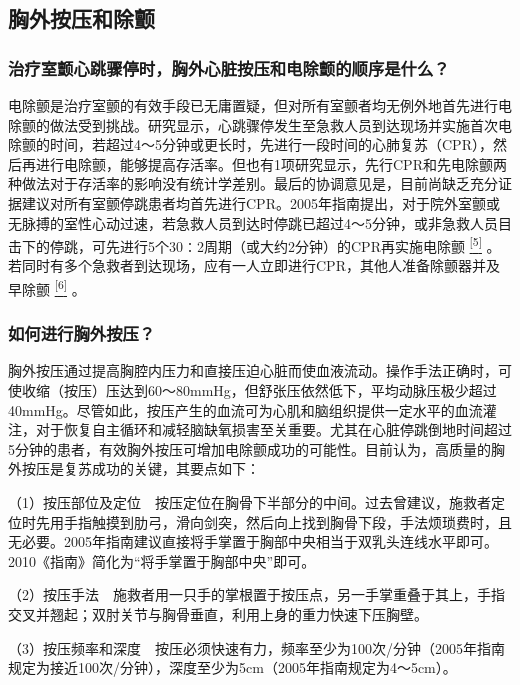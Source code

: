 \subsection{胸外按压和除颤}

\subsubsection{治疗室颤心跳骤停时，胸外心脏按压和电除颤的顺序是什么？}

电除颤是治疗室颤的有效手段已无庸置疑，但对所有室颤者均无例外地首先进行电除颤的做法受到挑战。研究显示，心跳骤停发生至急救人员到达现场并实施首次电除颤的时间，若超过4～5分钟或更长时，先进行一段时间的心肺复苏（CPR），然后再进行电除颤，能够提高存活率。但也有1项研究显示，先行CPR和先电除颤两种做法对于存活率的影响没有统计学差别。最后的协调意见是，目前尚缺乏充分证据建议对所有室颤停跳患者均首先进行CPR。2005年指南提出，对于院外室颤或无脉搏的室性心动过速，若急救人员到达时停跳已超过4～5分钟，或非急救人员目击下的停跳，可先进行5个30∶2周期（或大约2分钟）的CPR再实施电除颤
\protect\hyperlink{text00023.htmlux5cux23ch5-22}{\textsuperscript{{[}5{]}}}
。若同时有多个急救者到达现场，应有一人立即进行CPR，其他人准备除颤器并及早除颤
\protect\hyperlink{text00023.htmlux5cux23ch6-22}{\textsuperscript{{[}6{]}}}
。

\subsubsection{如何进行胸外按压？}

胸外按压通过提高胸腔内压力和直接压迫心脏而使血液流动。操作手法正确时，可使收缩（按压）压达到60～80mmHg，但舒张压依然低下，平均动脉压极少超过40mmHg。尽管如此，按压产生的血流可为心肌和脑组织提供一定水平的血流灌注，对于恢复自主循环和减轻脑缺氧损害至关重要。尤其在心脏停跳倒地时间超过5分钟的患者，有效胸外按压可增加电除颤成功的可能性。目前认为，高质量的胸外按压是复苏成功的关键，其要点如下：

（1）按压部位及定位　按压定位在胸骨下半部分的中间。过去曾建议，施救者定位时先用手指触摸到肋弓，滑向剑突，然后向上找到胸骨下段，手法烦琐费时，且无必要。2005年指南建议直接将手掌置于胸部中央相当于双乳头连线水平即可。2010《指南》简化为“将手掌置于胸部中央”即可。

（2）按压手法　施救者用一只手的掌根置于按压点，另一手掌重叠于其上，手指交叉并翘起；双肘关节与胸骨垂直，利用上身的重力快速下压胸壁。

（3）按压频率和深度　按压必须快速有力，频率至少为100次/分钟（2005年指南规定为接近100次/分钟），深度至少为5cm（2005年指南规定为4～5cm）。

